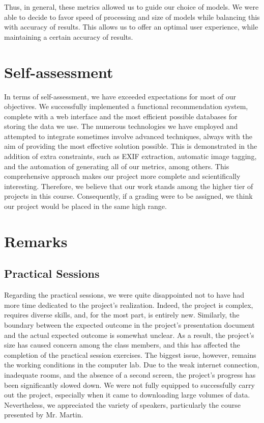 \documentclass{article}
\begin{document}
\begin{itemize}
    \end{itemize}

    Thus, in general, these metrics allowed us to guide our choice of models.
    We were able to decide to favor speed of processing and size of models while balancing this with accuracy of results.
    This allows us to offer an optimal user experience, while maintaining a certain accuracy of results.

    \section{Self-assessment}\label{sec:self_assessment}
    In terms of self-assessment, we have exceeded expectations for most of our objectives.
    We successfully implemented a functional recommendation system, complete with a web interface and the most efficient possible databases for storing the data we use.
    The numerous technologies we have employed and attempted to integrate sometimes involve advanced techniques, always with the aim of providing the most effective solution possible.
    This is demonstrated in the addition of extra constraints, such as EXIF extraction, automatic image tagging, and the automation of generating all of our metrics, among others.
    This comprehensive approach makes our project more complete and scientifically interesting.
    Therefore, we believe that our work stands among the higher tier of projects in this course.
    Consequently, if a grading were to be assigned, we think our project would be placed in the same high range.


    \section{Remarks}\label{sec:remarks}

    \subsection{Practical Sessions}\label{subsec:sessions}
    Regarding the practical sessions, we were quite disappointed not to have had more time dedicated to the project's realization.
    Indeed, the project is complex, requires diverse skills, and, for the most part, is entirely new.
    Similarly, the boundary between the expected outcome in the project's presentation document and the actual expected outcome is somewhat unclear.
    As a result, the project's size has caused concern among the class members, and this has affected the completion of the practical session exercises.
    The biggest issue, however, remains the working conditions in the computer lab.
    Due to the weak internet connection, inadequate rooms, and the absence of a second screen, the project's progress has been significantly slowed down.
    We were not fully equipped to successfully carry out the project, especially when it came to downloading large volumes of data.
    Nevertheless, we appreciated the variety of speakers, particularly the course presented by Mr. Martin.
\end{document}
